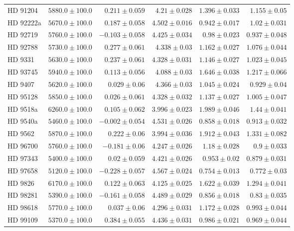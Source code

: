 \begin{longtable*}{lrrrrr}
HD 91204 & $5880.0\pm 100.0$ & $0.211\pm 0.059$ & $4.21\pm 0.028$ & $1.396\pm 0.033$ & $1.155\pm 0.05$ \\ 
HD 92222a & $5670.0\pm 100.0$ & $0.187\pm 0.058$ & $4.502\pm 0.016$ & $0.942\pm 0.017$ & $1.02\pm 0.031$ \\ 
HD 92719 & $5760.0\pm 100.0$ & $-0.103\pm 0.058$ & $4.425\pm 0.034$ & $0.98\pm 0.023$ & $0.937\pm 0.048$ \\ 
HD 92788 & $5730.0\pm 100.0$ & $0.277\pm 0.061$ & $4.338\pm 0.03$ & $1.162\pm 0.027$ & $1.076\pm 0.044$ \\ 
HD 9331 & $5630.0\pm 100.0$ & $0.237\pm 0.061$ & $4.328\pm 0.031$ & $1.146\pm 0.027$ & $1.023\pm 0.045$ \\ 
HD 93745 & $5940.0\pm 100.0$ & $0.113\pm 0.056$ & $4.088\pm 0.03$ & $1.646\pm 0.038$ & $1.217\pm 0.066$ \\ 
HD 9407 & $5620.0\pm 100.0$ & $0.029\pm 0.06$ & $4.366\pm 0.03$ & $1.045\pm 0.024$ & $0.929\pm 0.04$ \\ 
HD 95128 & $5850.0\pm 100.0$ & $0.026\pm 0.061$ & $4.328\pm 0.032$ & $1.137\pm 0.027$ & $1.005\pm 0.047$ \\ 
HD 9518a & $6260.0\pm 100.0$ & $0.105\pm 0.062$ & $3.996\pm 0.023$ & $1.989\pm 0.046$ & $1.44\pm 0.041$ \\ 
HD 9540a & $5460.0\pm 100.0$ & $-0.002\pm 0.054$ & $4.531\pm 0.026$ & $0.858\pm 0.018$ & $0.913\pm 0.032$ \\ 
HD 9562 & $5870.0\pm 100.0$ & $0.222\pm 0.06$ & $3.994\pm 0.036$ & $1.912\pm 0.043$ & $1.331\pm 0.082$ \\ 
HD 96700 & $5760.0\pm 100.0$ & $-0.181\pm 0.06$ & $4.247\pm 0.026$ & $1.18\pm 0.028$ & $0.9\pm 0.033$ \\ 
HD 97343 & $5400.0\pm 100.0$ & $0.02\pm 0.059$ & $4.421\pm 0.026$ & $0.953\pm 0.02$ & $0.879\pm 0.031$ \\ 
HD 97658 & $5120.0\pm 100.0$ & $-0.228\pm 0.057$ & $4.567\pm 0.024$ & $0.754\pm 0.013$ & $0.772\pm 0.03$ \\ 
HD 9826 & $6170.0\pm 100.0$ & $0.122\pm 0.063$ & $4.125\pm 0.025$ & $1.622\pm 0.039$ & $1.294\pm 0.041$ \\ 
HD 98281 & $5390.0\pm 100.0$ & $-0.161\pm 0.058$ & $4.489\pm 0.029$ & $0.856\pm 0.018$ & $0.83\pm 0.035$ \\ 
HD 98618 & $5770.0\pm 100.0$ & $0.037\pm 0.06$ & $4.296\pm 0.031$ & $1.172\pm 0.028$ & $0.993\pm 0.044$ \\ 
HD 99109 & $5370.0\pm 100.0$ & $0.384\pm 0.055$ & $4.436\pm 0.031$ & $0.986\pm 0.021$ & $0.969\pm 0.044$ \\ 

\end{longtable*}

